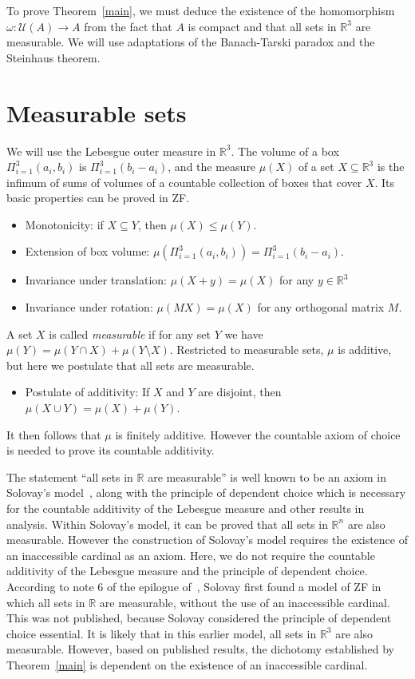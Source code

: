 \documentclass{lmcs}
\begin{document}
To prove Theorem~\ref{main}, we must deduce the existence of the homomorphism
$\omega: \mathcal{U}(A) \rightarrow A$ from the fact that $A$ is compact and that
all sets in $\mathbb{R}^3$ are measurable. We will use adaptations of the
Banach-Tarski paradox and the Steinhaus theorem.

\section{Measurable sets} \label{measure}
We will use the Lebesgue outer measure in $\mathbb{R}^3$. 
The volume of a box $\Pi_{i=1}^3 (a_i,b_i)$ is $\Pi_{i=1}^3 (b_i - a_i)$, 
and the measure $\mu(X)$ of a set $X \subseteq \mathbb{R}^3$ is the infimum of sums of volumes of a 
countable collection of boxes that cover $X$. Its basic properties can be proved in ZF.
\begin{itemize}
\item Monotonicity: if $X \subseteq Y$, then $\mu(X) \leq \mu(Y)$.
\item Extension of box volume: $\mu(\Pi_{i=1}^3 (a_i,b_i)) = \Pi_{i=1}^3 (b_i - a_i)$. 
\item Invariance under translation: $\mu(X + y) = \mu(X)$ for any $y \in \mathbb{R}^3$ 
\item Invariance under rotation: $\mu(MX) = \mu(X)$ for any orthogonal matrix $M$. 
\end{itemize}
A set $X$ is called {\em measurable} if for any set $Y$ we have $\mu(Y) = \mu(Y \cap X) + \mu(Y\setminus X)$.
Restricted to measurable sets, $\mu$ is additive, but here we postulate that all sets are measurable.
\begin{itemize}
\item Postulate of additivity: If $X$ and $Y$ are disjoint, then $\mu(X \cup Y) = \mu(X) + \mu(Y)$.
\end{itemize}
It then follows that $\mu$ is finitely additive. However the countable axiom of choice 
is needed to prove its countable additivity. 

The statement ``all sets in $\mathbb{R}$ are measurable'' is well known to be an axiom in
Solovay's model~\cite{solovay}, along with the principle of dependent choice which is
necessary for the countable additivity of the Lebesgue measure and other results in analysis.
Within Solovay's model, it can be proved that all sets in 
$\mathbb{R}^n$ are also measurable.
However the construction of Solovay's model requires the existence of an inaccessible cardinal as an axiom. 
Here, we do not require the countable additivity of the 
Lebesgue measure and the principle of dependent choice.
According to note 6 of the epilogue of~\cite{moore},
Solovay first found a model of ZF in which all sets in 
$\mathbb{R}$ are measurable,
without the use of an inaccessible cardinal.
This was not published, because Solovay considered
the principle of dependent choice essential.
It is likely that in this earlier model,
all sets in $\mathbb{R}^3$ are also measurable. 
However, based on published results, the
dichotomy established by Theorem~\ref{main} is dependent
on the existence of an inaccessible cardinal.
\end{document}
